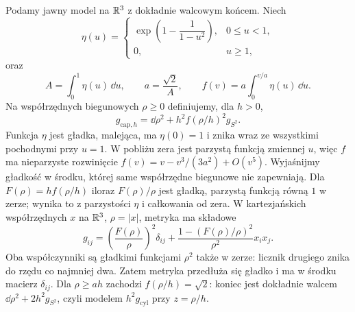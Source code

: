 \begin{przyklad}
\label{prz:poincare3-cap-metric}
Podamy jawny model na $\mathbb{R}^3$ z dokładnie
walcowym końcem. Niech
\[
 \eta(u)=
 \begin{cases}
  \exp\!\left(1-\dfrac{1}{1-u^2}\right),&0\leq u<1,\\
  0,&u\geq1,
 \end{cases}
\]
oraz
\[
 A=\int_0^1\eta(u)\,\dd u,\qquad
 a=\frac{\sqrt2}{A},\qquad
 f(v)=a\int_0^{v/a}\eta(u)\,\dd u.
\]
Na współrzędnych biegunowych $\rho\geq0$
definiujemy, dla $h>0$,
\begin{equation}\label{eq:poincare3-cap-metric}
 g_{\mathrm{cap},h}
 =\dd\rho^2+h^2f(\rho/h)^2g_{S^2}.
\end{equation}
Funkcja $\eta$ jest gładka, malejąca, ma
$\eta(0)=1$ i znika wraz ze wszystkimi
pochodnymi przy $u=1$. W pobliżu zera jest
parzystą funkcją zmiennej $u$, więc $f$
ma nieparzyste rozwinięcie
$f(v)=v-v^3/(3a^2)+O(v^5)$.
Wyjaśnijmy gładkość w środku, której same współrzędne
biegunowe nie zapewniają. Dla $F(\rho)=hf(\rho/h)$ iloraz
$F(\rho)/\rho$ jest gładką, parzystą funkcją równą $1$
w zerze; wynika to z parzystości $\eta$ i całkowania od zera.
W kartezjańskich współrzędnych $x$ na $\mathbb{R}^3$, $\rho=|x|$,
metryka ma składowe
\[
 g_{ij}=\left(\frac{F(\rho)}\rho\right)^2\delta_{ij}
       +\frac{1-(F(\rho)/\rho)^2}{\rho^2}x_ix_j.
\]
Oba współczynniki są gładkimi funkcjami $\rho^2$ także
w zerze: licznik drugiego znika do rzędu co najmniej dwa.
Zatem metryka przedłuża się gładko i ma w środku macierz
$\delta_{ij}$.
Dla $\rho\geq ah$ zachodzi $f(\rho/h)=\sqrt2$:
koniec jest dokładnie walcem
$\dd\rho^2+2h^2g_{S^2}$, czyli modelem
$h^2g_{\mathrm{cyl}}$ przy $z=\rho/h$.


\end{przyklad}
